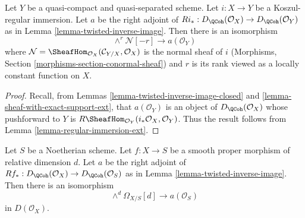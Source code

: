 \begin{lemma}
\label{lemma-regular-immersion}
Let $Y$ be a quasi-compact and quasi-separated scheme.
Let $i : X \to Y$ be a Koszul-regular immersion.
Let $a$ be the right adjoint of
$Ri_* : D_\QCoh(\mathcal{O}_X) \to D_\QCoh(\mathcal{O}_Y)$ as in
Lemma \ref{lemma-twisted-inverse-image}. Then there is an isomorphism
$$
\wedge^r\mathcal{N}[-r] \longrightarrow a(\mathcal{O}_Y)
$$
where
$\mathcal{N} = \SheafHom_{\mathcal{O}_X}(\mathcal{C}_{Y/X}, \mathcal{O}_X)$
is the normal sheaf of $i$
(Morphisms, Section \ref{morphisms-section-conormal-sheaf})
and $r$ is its rank viewed as a locally constant
function on $X$.
\end{lemma}

\begin{proof}
Recall, from Lemmas \ref{lemma-twisted-inverse-image-closed}
and \ref{lemma-sheaf-with-exact-support-ext},
that $a(\mathcal{O}_Y)$ is an object of $D_\QCoh(\mathcal{O}_X)$ whose
pushforward to $Y$ is
$R\SheafHom_{\mathcal{O}_Y}(i_*\mathcal{O}_X, \mathcal{O}_Y)$.
Thus the result follows from Lemma \ref{lemma-regular-immersion-ext}.
\end{proof}

\begin{lemma}
\label{lemma-smooth-proper}
Let $S$ be a Noetherian scheme.
Let $f : X \to S$ be a smooth proper morphism of relative dimension $d$.
Let $a$ be the right adjoint of
$Rf_* : D_\QCoh(\mathcal{O}_X) \to D_\QCoh(\mathcal{O}_S)$ as in
Lemma \ref{lemma-twisted-inverse-image}. Then there is an isomorphism
$$
\wedge^d \Omega_{X/S}[d] \longrightarrow a(\mathcal{O}_S)
$$
in $D(\mathcal{O}_X)$.
\end{lemma}


